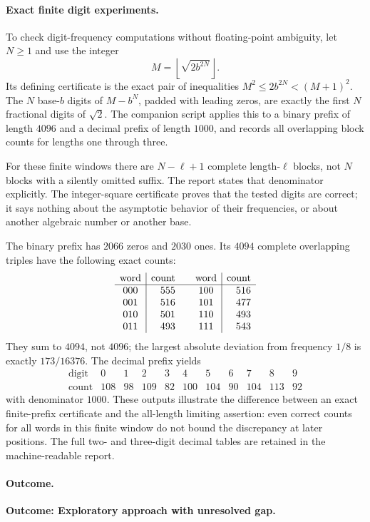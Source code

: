 \documentclass[11pt,a4paper]{article}
\numberwithin{equation}{section}
\begin{document}
\paragraph{Exact finite digit experiments.}
To check digit-frequency computations without floating-point ambiguity,
let $N\geq1$ and use the integer
\[
 M=\left\lfloor\sqrt{2b^{2N}}\right\rfloor.
\]
Its defining certificate is the exact pair of inequalities
$M^2\leq2b^{2N}<(M+1)^2$.  The $N$ base-$b$ digits of $M-b^N$,
padded with leading zeros, are exactly the first $N$ fractional digits
of $\sqrt2$.  The companion script applies this to a binary prefix
of length $4096$ and a decimal prefix of length $1000$, and records
all overlapping block counts for lengths one through three.

For these finite windows there are $N-\ell+1$ complete length-$\ell$
blocks, not $N$ blocks with a silently omitted suffix.  The report
states that denominator explicitly.  The integer-square certificate
proves that the tested digits are correct; it says nothing about the
asymptotic behavior of their frequencies, or about another algebraic
number or another base.

The binary prefix has $2066$ zeros and $2030$ ones. Its $4094$
complete overlapping triples have the following exact counts:
\[
\begin{array}{c|r@{\qquad}c|r}
\text{word}&\text{count}&\text{word}&\text{count}\\\hline
000&555&100&516\\
001&516&101&477\\
010&501&110&493\\
011&493&111&543
\end{array}
\]
They sum to $4094$, not $4096$; the largest absolute deviation from
frequency $1/8$ is exactly $173/16376$. The decimal prefix yields
\[
\begin{array}{c|rrrrrrrrrr}
\text{digit}&0&1&2&3&4&5&6&7&8&9\\\hline
\text{count}&108&98&109&82&100&104&90&104&113&92
\end{array}
\]
with denominator $1000$. These outputs illustrate the difference
between an exact finite-prefix certificate and the all-length limiting
assertion: even correct counts for all words in this finite window do
not bound the discrepancy at later positions. The full two- and
three-digit decimal tables are retained in the machine-readable report.

\paragraph{Outcome.}
\textbf{Outcome: Exploratory approach with unresolved gap.}
\end{document}
